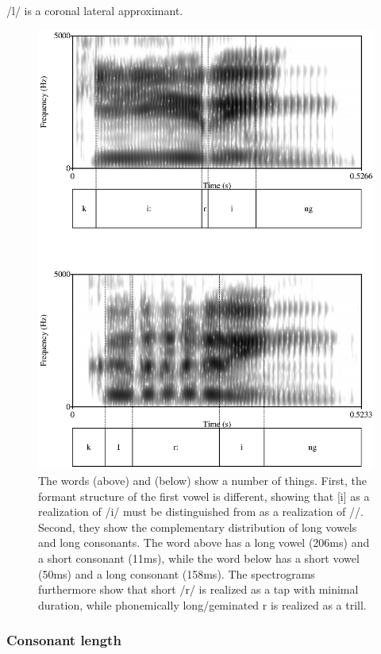 /l/ is a coronal lateral approximant.

\begin{figure}
 \centering
 \includegraphics[width=.8\textwidth]{pics/kiiringkirring.eps}
 \caption[Differences in length and vowel quality between    and ]{The words  (above) and  (below) show a number of things. First, the formant structure of the first vowel is different, showing that [i] as a realization of /i/ must be distinguished from  as a realization of /\E/. Second, they show the complementary distribution of long vowels and long consonants. The word above has a long vowel (206ms) and a short consonant (11ms), while the word below has a short vowel (50ms) and a long consonant (158ms). The spectrograms furthermore show that short /r/ is realized as a tap with minimal duration, while phonemically long/geminated r is realized as a trill. }
 \label{fig:kiiringkirring}
\end{figure}

\subsubsection{Consonant length}\label{sec:phon:Consonantlength}

